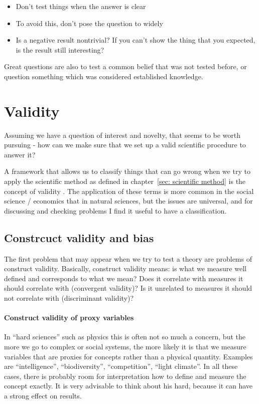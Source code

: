 \documentclass{tufte-book}
\begin{document}
\begin{itemize}
\item Don’t test things when the answer is clear
\item To avoid this, don’t pose the question to widely
\item Is a negative result nontrivial? If you can’t show the thing that you expected, is the result still interesting?
\end{itemize}

Great questions are also to test a common belief that was not tested before, or question something which was considered established knowledge. 

\section{Validity}

Assuming we have a question of interest and novelty, that seems to be worth pursuing - how can we make sure that we set up a valid scientific procedure to answer it?


A framework that allows us to classify things that can go wrong when we try to apply the scientific method as defined in chapter~\ref{sec: scientific method} is the concept of validity \citep[][]{Shadish-Experimentalandquasi-2002}. The application of these terms is more common in the social science / economics that in natural sciences, but the issues are universal, and for discussing and checking problems I find it useful to have a classification. 

\subsection{Constrcuct validity and bias}

The first problem that may appear when we try to test a theory are problems of construct validity. Basically, construct validity means: is what we measure well defined and corresponds to what we mean? Does it correlate with measures it should correlate with (convergent validity)? Is it unrelated to measures it should not correlate with (discriminant validity)?

\paragraph{Construct validity of proxy variables} In ``hard sciences'' such as physics this is often not so much a concern, but the more we go to complex or social systems, the more likely it is that we measure variables that are proxies for concepts rather than a physical quantity. Examples are ``intelligence'', ``biodiversity'', ``competition'', ``light climate''. In all these cases, there is probably room for interpretation how to define and measure the concept exactly. It is very advisable to think about his hard, because it can have a strong effect on results. 
\end{document}
